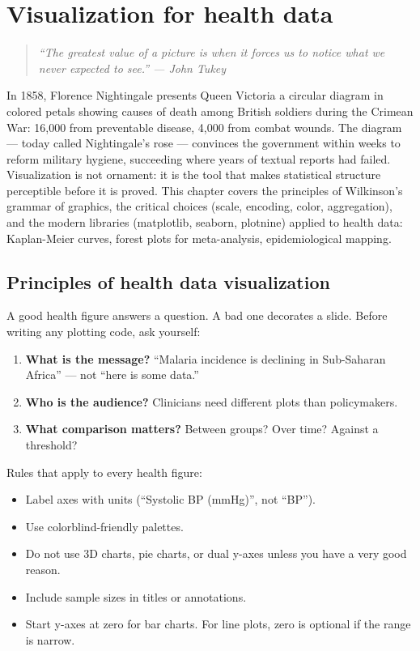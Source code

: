 \chapter{Visualization for health data}
\label{ch:visualization}

\begin{quote}
\emph{``The greatest value of a picture is when it forces us to notice what we never expected to see.'' --- John Tukey}
\end{quote}

In 1858, Florence Nightingale presents Queen Victoria a circular diagram in colored petals showing causes of death among British soldiers during the Crimean War: 16{,}000 from preventable disease, 4{,}000 from combat wounds. The diagram --- today called Nightingale's rose --- convinces the government within weeks to reform military hygiene, succeeding where years of textual reports had failed. Visualization is not ornament: it is the tool that makes statistical structure perceptible before it is proved. This chapter covers the principles of Wilkinson's grammar of graphics, the critical choices (scale, encoding, color, aggregation), and the modern libraries (matplotlib, seaborn, plotnine) applied to health data: Kaplan-Meier curves, forest plots for meta-analysis, epidemiological mapping.

\section{Principles of health data visualization}

A good health figure answers a question. A bad one decorates a slide. Before writing any plotting code, ask yourself:
\begin{enumerate}
  \item \textbf{What is the message?} ``Malaria incidence is declining in Sub-Saharan Africa'' --- not ``here is some data.''
  \item \textbf{Who is the audience?} Clinicians need different plots than policymakers.
  \item \textbf{What comparison matters?} Between groups? Over time? Against a threshold?
\end{enumerate}

Rules that apply to every health figure:
\begin{itemize}
  \item Label axes with units (``Systolic BP (mmHg)'', not ``BP'').
  \item Use colorblind-friendly palettes.
  \item Do not use 3D charts, pie charts, or dual y-axes unless you have a very good reason.
  \item Include sample sizes in titles or annotations.
  \item Start y-axes at zero for bar charts. For line plots, zero is optional if the range is narrow.
\end{itemize}

